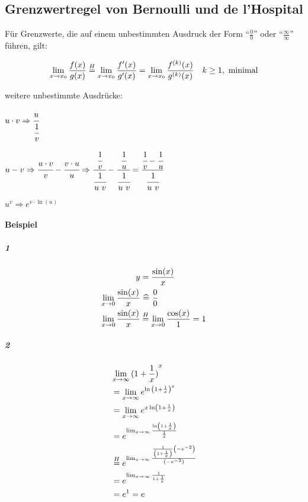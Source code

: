 \subsection{Grenzwertregel von Bernoulli und de l’Hospital}

Für Grenzwerte, die auf einem unbestimmten Ausdruck der Form \enquote{\( \frac{0}{0} \)} oder \enquote{\( \frac{\infty}{\infty} \)} führen, gilt:

\[
    \lim_{x \rightarrow{} x_0} \frac{f(x)}{g(x)} \overset{H}{=}
    \lim_{x \rightarrow{} x_0} \frac{f'(x)}{g'(x)} =
    \lim_{x \rightarrow{} x_0} \frac{f^{(k)}(x)}{g^{(k)}(x)}
    \quad k \geq 1,\ \text{minimal}
\]

weitere unbestimmte Ausdrücke:

\begin{description}[style=nextline]
    \item[\( 0 \cdot \infty,\ \infty \cdot 0 \)]
    \( u \cdot v
    \Rightarrow \cfrac{u}{\cfrac{1}{v}} \)
    \item[\( \infty - \infty \)]
    \( u - v
    \Rightarrow \cfrac{u \cdot v}{v} - \cfrac{v \cdot u}{u}
    \Rightarrow \cfrac{\cfrac{1}{v}}{\cfrac{1}{u\ v}} - \cfrac{\cfrac{1}{u}}{\cfrac{1}{u\ v}} = \cfrac{\cfrac{1}{v}-\cfrac{1}{u}}{\cfrac{1}{u\ v}} \)
    \item[\( 0^0,\ \infty^0,\ 1^\infty \)]
    \(
        u^v \Rightarrow e^{v \cdot \ln(u)} 
    \) 
\end{description}

\paragraph{Beispiel}

\subparagraph{1}

\begin{align*}
    y &= \frac{\sin(x)}{x} \\
    \lim_{x \rightarrow{} 0} \frac{\sin(x)}{x} &\ \widehat{=}\  \frac{0}{0} \\
    \lim_{x \rightarrow{} 0} \frac{\sin(x)}{x} &\overset{H}{=} \lim_{x \rightarrow{} 0} \frac{\cos(x)}{1} = 1
\end{align*}

\subparagraph{2}

\begin{align*}
    & \lim_{x \rightarrow{} \infty} {(1 + \frac{1}{x})}^x \\
    &= \lim_{x \rightarrow{} \infty} e^{\ln {\left( 1 + \frac{1}{x} \right)}^x} \\
    &= \lim_{x \rightarrow{} \infty} e^{x \ln \left( 1 + \frac{1}{x} \right)} \\
    &= e^{\lim_{x \rightarrow{} \infty} \frac{\ln \left( 1 + \frac{1}{x} \right)}{\frac{1}{x}}} \\
    &\overset{H}{=} e^{\lim_{x \rightarrow{} \infty} \frac{\frac{1}{\left(1 + \frac{1}{x}\right)} \left( -x^{-2} \right)}{\left( -x^{-2} \right)}} \\
    &= e^{\lim_{x \rightarrow{} \infty} \frac{1}{1 + \frac{1}{x}}} \\
    &= e^1 = e
\end{align*}
